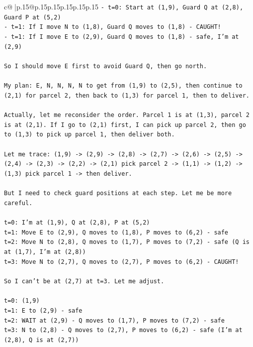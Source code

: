 \documentclass{article}
\begin{document}
{\begin{supertabular}{c@{$\;$}|p{.15\linewidth}@{}p{.15\linewidth}p{.15\linewidth}p{.15\linewidth}p{.15\linewidth}p{.15\linewidth}}
{{{\texttt{{-} t=0: Start at (1,9), Guard Q at (2,8), Guard P at (5,2)} \\
\texttt{{-} t=1: If I move N to (1,8), Guard Q moves to (1,8) {-} CAUGHT!} \\
\texttt{{-} t=1: If I move E to (2,9), Guard Q moves to (1,8) {-} safe, I'm at (2,9)} \\
\\ 
\texttt{So I should move E first to avoid Guard Q, then go north.} \\
\\ 
\texttt{My plan: E, N, N, N, N to get from (1,9) to (2,5), then continue to (2,1) for parcel 2, then back to (1,3) for parcel 1, then to deliver.} \\
\\ 
\texttt{Actually, let me reconsider the order. Parcel 1 is at (1,3), parcel 2 is at (2,1). If I go to (2,1) first, I can pick up parcel 2, then go to (1,3) to pick up parcel 1, then deliver both.} \\
\\ 
\texttt{Let me trace: (1,9) {-}> (2,9) {-}> (2,8) {-}> (2,7) {-}> (2,6) {-}> (2,5) {-}> (2,4) {-}> (2,3) {-}> (2,2) {-}> (2,1) pick parcel 2 {-}> (1,1) {-}> (1,2) {-}> (1,3) pick parcel 1 {-}> then deliver.} \\
\\ 
\texttt{But I need to check guard positions at each step. Let me be more careful.} \\
\\ 
\texttt{t=0: I'm at (1,9), Q at (2,8), P at (5,2)} \\
\texttt{t=1: Move E to (2,9), Q moves to (1,8), P moves to (6,2) {-} safe} \\
\texttt{t=2: Move N to (2,8), Q moves to (1,7), P moves to (7,2) {-} safe (Q is at (1,7), I'm at (2,8))} \\
\texttt{t=3: Move N to (2,7), Q moves to (2,7), P moves to (6,2) {-} CAUGHT!} \\
\\ 
\texttt{So I can't be at (2,7) at t=3. Let me adjust.} \\
\\ 
\texttt{t=0: (1,9)} \\
\texttt{t=1: E to (2,9) {-} safe} \\
\texttt{t=2: WAIT at (2,9) {-} Q moves to (1,7), P moves to (7,2) {-} safe} \\
\texttt{t=3: N to (2,8) {-} Q moves to (2,7), P moves to (6,2) {-} safe (I'm at (2,8), Q is at (2,7))} \\
}}}
\end{supertabular}}
\end{document}
